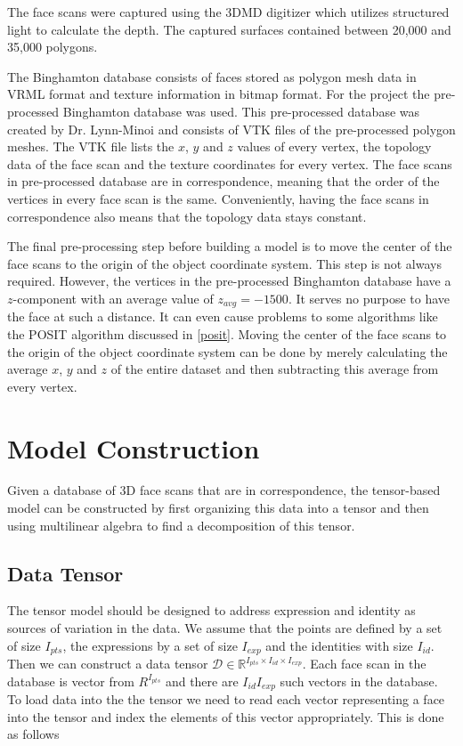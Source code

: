 \documentclass[11pt,a4paper,twoside]{report}
\begin{document}
The face scans were captured using the 3DMD digitizer which utilizes structured light to
calculate the depth. The captured surfaces contained between 20,000 and 35,000
polygons.


The Binghamton database consists of faces stored as polygon mesh data in VRML
format and texture information in bitmap format. For the project the pre-processed Binghamton
database was used. This pre-processed database was created by Dr. Lynn-Minoi
\cite{jacey} and consists of VTK files of the pre-processed polygon meshes. The
VTK file lists the $x$, $y$ and $z$ values of every vertex, the topology data
of the face scan and the texture coordinates for every vertex. The face scans in
pre-processed database are in correspondence, meaning that the order of the
vertices in every face scan is the same. Conveniently, having the face scans in
correspondence also means that the topology data stays constant.


The final pre-processing step before building a model is to move the center of the
face scans to the origin of the object coordinate system. This step is not always required. However, the vertices in the
pre-processed Binghamton database have a $z$-component with an average value of
$z_{avg}=-1500$. It serves no purpose to have the face at such a distance. It
can even cause problems to some algorithms like the POSIT algorithm discussed in
\ref{posit}. Moving the center of the face scans to the origin of the object coordinate
system can be done by merely calculating the average $x$, $y$ and $z$ of the
entire dataset and then subtracting this average from every vertex.


\section{Model Construction}
Given a database of 3D face scans that are in correspondence, the tensor-based
model can be constructed by first organizing this data into a tensor and
then using multilinear algebra to find a decomposition of this tensor.

\subsection{Data Tensor}\label{s:datatesnor}
The tensor model should be designed to address expression and identity as sources of variation in
the data. We assume that the points are defined by a set of size $I_{pts}$, the
expressions by a set of size $I_{exp}$ and the identities with size $I_{id}$. Then we can
construct a data tensor $\mathcal{D} \in \mathbb{R}^{I_{pts} \times I_{id}
  \times I_{exp}}$. Each face scan in the database is vector from
$R^{I_{pts}}$ and there are $I_{id}I_{exp}$ such vectors in the database. To load data into the the tensor we need to read each vector
representing a face into the tensor and index the elements of this vector
appropriately. This is done as follows
\end{document}
